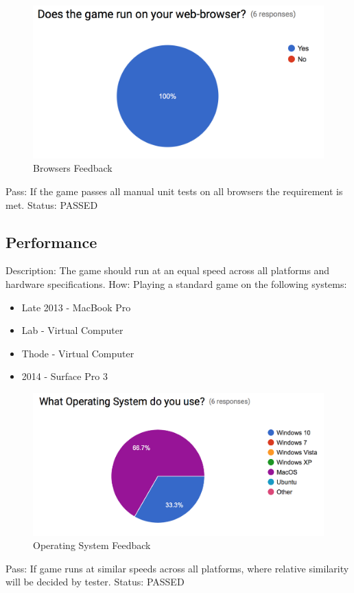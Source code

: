 \documentclass{article}
\begin{document}
\begin{figure}[H]
	\centering
	\includegraphics[width=\textwidth]{./Figures/8.png}
	\caption{Browsers Feedback}
\end{figure}
Pass:  If the game passes all manual unit tests on all browsers the requirement
 is met.\newline
 \newline
Status: PASSED

 \subsection{Performance}
 \label{sec:4.4}
Description: The game should run at an equal speed across all platforms and 
hardware specifications.  \newline
How: Playing a standard game on the following systems: 
\begin{itemize}
\item Late 2013 - MacBook Pro
\item Lab - Virtual Computer
\item Thode - Virtual Computer
\item 2014 - Surface Pro 3
\end{itemize}
\begin{figure}[H]
	\centering
	\includegraphics[width=\textwidth]{./Figures/10.png}
	\caption{Operating System Feedback}
\end{figure}
Pass: If game runs at similar speeds across all platforms, where relative 
similarity will be decided by tester.
\newline
 \newline
Status: PASSED
\end{document}
